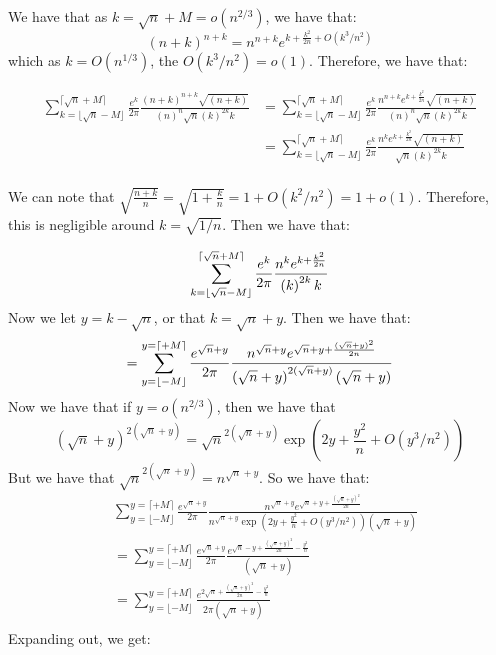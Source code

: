 \documentclass[]{article}
\begin{document}
We have that as $k = \sqrt{n} + M = o(n^{2/3})$, we have that:
\begin{equation}
	\left(n + k\right)^{n + k} = n^{n + k} e^{k + \frac{k^2}{2n} + O(k^3/n^2)}
\end{equation}
which as $k = O(n^{1/3})$, the $O(k^3/n^2) = o(1)$. Therefore, we have that:

\begin{align*}
	\sum_{k = \lfloor \sqrt{n} - M \rfloor }^{ \lceil \sqrt{n} + M \rceil} \frac{e^{k}}{2\pi} \frac{\left(n + k\right)^{n + k}\sqrt{(n + k)}}{\left(n\right)^n \sqrt{n} \left(k\right)^{2k}k } &= 
	\sum_{k = \lfloor \sqrt{n} - M \rfloor }^{ \lceil \sqrt{n} + M \rceil} \frac{e^{k}}{2\pi} \frac{n^{n + k} e^{k + \frac{k^2}{2n}}\sqrt{(n + k)}}{\left(n\right)^n \sqrt{n} \left(k\right)^{2k}k }\\
	&=
	\sum_{k = \lfloor \sqrt{n} - M \rfloor }^{ \lceil \sqrt{n} + M \rceil}
	\frac{e^{k}}{2\pi}
	\frac{n^{k} e^{k + \frac{k^2}{2n}}\sqrt{(n + k)}}
	{\sqrt{n} \left(k\right)^{2k}k }\\
\end{align*}


We can note that $\sqrt{\frac{n + k}{n}}= \sqrt{1 + \frac{k}{n}} = 1 + O(k^2/n^2) = 1 + o(1)$. Therefore, this is negligible around $k = \sqrt{1/n}$. Then we have that:

\begin{equation*}
	\sum_{k = \lfloor \sqrt{n} - M \rfloor }^{ \lceil \sqrt{n} + M \rceil}
	\frac{e^{k}}{2\pi}
	\frac{n^{k} e^{k + \frac{k^2}{2n}}}
	{ \left(k\right)^{2k}k }\\
\end{equation*}
Now we let $y = k - \sqrt{n}$, or that $k = \sqrt{n} + y$. Then we have that:
\begin{equation*}
	=
	\sum_{y = \lfloor -M \rfloor }^{y =  \lceil + M \rceil}
	\frac{e^{\sqrt{n} + y}}{2\pi}
	\frac{n^{\sqrt{n} + y} e^{\sqrt{n} + y + \frac{(\sqrt{n} + y)^2}{2n}}}
	{ \left(\sqrt{n} + y\right)^{2(\sqrt{n} + y)}(\sqrt{n} + y) }\\
\end{equation*}
Now we have that if $y = o(n^{2/3})$, then we have that
\begin{equation}
	 \left(\sqrt{n} + y\right)^{2(\sqrt{n} + y)} = \sqrt{n}^{2 (\sqrt{n} + y)} \exp(2y + \frac{y^2}{n} + O(y^3/n^2))
\end{equation}
But we have that $\sqrt{n}^{2 (\sqrt{n} + y)}  = n^{\sqrt{n} + y}$. So we have that:
\begin{align*}
	&\sum_{y = \lfloor -M \rfloor }^{y =  \lceil + M \rceil}
	\frac{e^{\sqrt{n} + y}}{2\pi}
	\frac{n^{\sqrt{n} + y} e^{\sqrt{n} + y + \frac{(\sqrt{n} + y)^2}{2n}}}
	{ n^{\sqrt{n} + y}\exp(2y + \frac{y^2}{n} + O(y^3/n^2)) (\sqrt{n} + y) }\\
	&=
	\sum_{y = \lfloor -M \rfloor }^{y =  \lceil + M \rceil}
	\frac{e^{\sqrt{n} + y}}{2\pi}
	\frac{ e^{\sqrt{n} - y + \frac{(\sqrt{n} + y)^2}{2n} - \frac{y^2}{n}}}
	{(\sqrt{n} + y) }\\
	&=
	\sum_{y = \lfloor -M \rfloor }^{y =  \lceil + M \rceil}
	\frac{ e^{2\sqrt{n} + \frac{(\sqrt{n} + y)^2}{2n} - \frac{y^2}{n}}}
	{2 \pi(\sqrt{n} + y) }\\
\end{align*}
Expanding out, we get:
\end{document}
